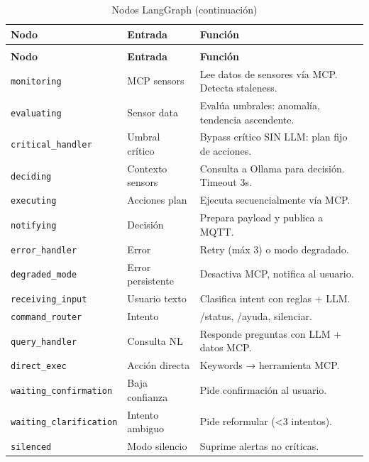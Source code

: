 \documentclass[12pt,letterpaper]{article}
\begin{document}
\small
\setlength{\LTleft}{0pt plus 1fill}
\setlength{\LTright}{0pt plus 1fill}
\begin{longtable}{p{3.5cm}p{2.5cm}p{6.5cm}}
    \caption{Nodos del StateGraph LangGraph.} \\
    \toprule
    \textbf{Nodo} & \textbf{Entrada} & \textbf{Función} \\
    \midrule
    \endfirsthead
    \caption[]{Nodos LangGraph (continuación)} \\
    \toprule
    \textbf{Nodo} & \textbf{Entrada} & \textbf{Función} \\
    \midrule
    \endhead
    \bottomrule
    \endfoot
    \mbox{\texttt{monitoring}} & MCP sensors & Lee datos de sensores vía MCP. Detecta staleness. \\
    \mbox{\texttt{evaluating}} & Sensor data & Evalúa umbrales: anomalía, tendencia ascendente. \\
    \mbox{\texttt{critical\_handler}} & Umbral crítico & Bypass crítico SIN LLM: plan fijo de acciones. \\
    \mbox{\texttt{deciding}} & Contexto sensors & Consulta a Ollama para decisión. Timeout 3s. \\
    \mbox{\texttt{executing}} & Acciones plan & Ejecuta secuencialmente vía MCP. \\
    \mbox{\texttt{notifying}} & Decisión & Prepara payload y publica a MQTT. \\
    \mbox{\texttt{error\_handler}} & Error & Retry (máx 3) o modo degradado. \\
    \mbox{\texttt{degraded\_mode}} & Error persistente & Desactiva MCP, notifica al usuario. \\
    \mbox{\texttt{receiving\_input}} & Usuario texto & Clasifica intent con reglas + LLM. \\
    \mbox{\texttt{command\_router}} & Intento & /status, /ayuda, silenciar. \\
    \mbox{\texttt{query\_handler}} & Consulta NL & Responde preguntas con LLM + datos MCP. \\
    \mbox{\texttt{direct\_exec}} & Acción directa & Keywords → herramienta MCP. \\
    \mbox{\texttt{waiting\_confirmation}} & Baja confianza & Pide confirmación al usuario. \\
    \mbox{\texttt{waiting\_clarification}} & Intento ambiguo & Pide reformular (\textless3 intentos). \\
    \mbox{\texttt{silenced}} & Modo silencio & Suprime alertas no críticas. \\
\end{longtable}
\setlength{\LTleft}{0pt}
\setlength{\LTright}{0pt}
\end{document}
